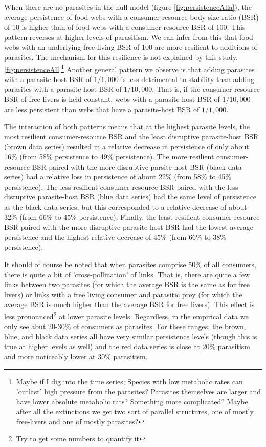 \documentclass[11pt]{amsart}
\begin{document}
When there are no parasites in the null model (figure \ref{fig:persistenceAlla}), the average persistence of food webs with a consumer-resource body size ratio (BSR) of 10 is higher than of food webs with a consumer-resource BSR of 100.  This pattern reverses at higher levels of parasitism.  We can infer from this that food webs with an underlying free-living BSR of 100 are more resilient to additions of parasites.  The mechanism for this resilience is not explained by this study.\ref{fig:persistenceAll}\footnote{Maybe if I dig into the time series;  Species with low metabolic rates can 'outlast' high pressure from the parasites? Parasites themselves are larger and have lower absolute metabolic rats? Something more complicated?  Maybe after all the extinctions we get two sort of parallel structures, one of mostly free-livers and one of mostly parasites?}   Another general pattern we observe is that adding parasites with a parasite-host BSR of $1/1,000$ is less detrimental to stability than adding parasites with a parasite-host BSR of $1/10,000$.  That is, if the consumer-resource BSR of free livers is held constant, webs with a parasite-host BSR of $1/10,000$ are less persistent than webs that have a parasite-host BSR of $1/1,000$.


The interaction of both patterns means that at the highest parasite levels, the most resilient consumer-resource BSR and the least disruptive parasite-host BSR (brown data series) resulted in a relative decrease in persistence of only about 16\% (from 58\% persistence to 49\% persistence).  The more resilient consumer-resource BSR paired with the more disruptive parsite-host BSR (black data series) had a relative loss in persistence of about 22\% (from 58\% to 45\% persistence). The less resilient consumer-resource BSR paired with the less disruptive parasite-host BSR (blue data series) had the same level of persistence as the black data series, but this corresponded to a relative decrease of about 32\% (from 66\% to 45\% persistence).  Finally, the least resilient consumer-resource BSR paired with the more disruptive parasite-host BSR had the lowest average persistence and the highest relative decrease of 45\% (from 66\% to 38\% persistence). 

It should of course be noted that when parasites comprise 50\% of all consumers, there is quite a bit of 'cross-pollination' of links.  That is, there are quite a few links between two parasites (for which the average BSR is the same as for free livers) or links with a free living consumer and parasitic prey (for which the average BSR is much higher than the average BSR for free livers).  This effect is less pronounced\footnote{Try to get some numbers to quantify it} at lower parasite levels.  Regardless, in the empirical data we only see abut 20-30\% of consumers as parasites.  For these ranges, the brown, blue, and black data series all have very similar persistence levels (though this is true at higher levels as well) and the red data series is close at 20\% parasitism and more noticeably lower at 30\% parasitism.
\end{document}
